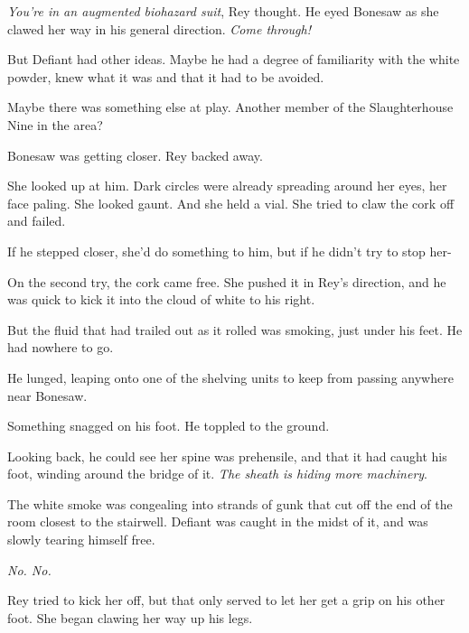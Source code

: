 \emph{You're in an augmented biohazard suit}, Rey thought.  He eyed Bonesaw as she clawed her way in his general direction.  \emph{Come through!}



But Defiant had other ideas.  Maybe he had a degree of familiarity with the white powder, knew what it was and that it had to be avoided.



Maybe there was something else at play.  Another member of the Slaughterhouse Nine in the area?



Bonesaw was getting closer.  Rey backed away.



She looked up at him.  Dark circles were already spreading around her eyes, her face paling.  She looked gaunt.  And she held a vial.  She tried to claw the cork off and failed.



If he stepped closer, she'd do something to him, but if he didn't try to stop her-



On the second try, the cork came free.  She pushed it in Rey's direction, and he was quick to kick it into the cloud of white to his right.



But the fluid that had trailed out as it rolled was smoking, just under his feet.  He had nowhere to go.



He lunged, leaping onto one of the shelving units to keep from passing anywhere near Bonesaw.



Something snagged on his foot.  He toppled to the ground.



Looking back, he could see her spine was prehensile, and that it had caught his foot, winding around the bridge of it.  \emph{The sheath is hiding more machinery}.



The white smoke was congealing into strands of gunk that cut off the end of the room closest to the stairwell.  Defiant was caught in the midst of it, and was slowly tearing himself free.



\emph{No.  No.}



Rey tried to kick her off, but that only served to let her get a grip on his other foot.  She began clawing her way up his legs.



